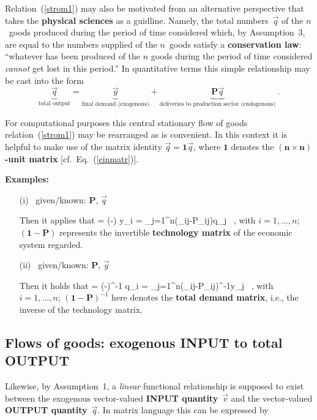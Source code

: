 \medskip
\noindent
Relation~(\ref{strom1}) may also be motivated from an alternative 
perspective that takes the {\bf physical sciences} as a guidline. 
Namely, the total numbers~$\vec{q}$ of the $n$~goods produced 
during the period of time considered which, by Assumption~3, are 
equal to the numbers supplied of the $n$~goods satisfy a {\bf  
conservation law}: ``whatever has been produced of the $n$ goods 
during the period of time considered \emph{cannot} get lost in 
this period.'' In quantitative terms this simple relationship may 
be cast into the form
%
\[
\underbrace{\vec{q}}_{\text{total output}}
=\underbrace{\vec{y}}_{\text{final demand (exogenous)}}
+\underbrace{\mathbf{P}\vec{q}}_{\text{deliveries to production sector (endogenous)}} \ .
\]
%

\medskip
\noindent
For computational purposes this central stationary flow of goods 
relation~(\ref{strom1}) may be rearranged as is convenient. In 
this context it is helpful to make use of the matrix identity  
$\vec{q}=\mathbf{1}\vec{q}$, where $\mathbf{1}$ denotes the
{\bf $\boldsymbol{(n \times n)}$-unit matrix} [cf.\ 
Eq.~(\ref{einmatr})].

\medskip
\noindent
{\bf Examples:}
%
\begin{itemize}
\item[(i)]~given/known: $\mathbf{P}$, $\vec{q}$

\medskip
\noindent
Then it applies that
%
\be
{}
 = (-)
\quad \Leftrightarrow \quad
y_{i} = \sum_{j=1}^{n}(\delta_{ij}-P_{ij})q_{j} \ ,
\ee
%
with $i = 1, \ldots, n$; $(\mathbf{1}-\mathbf{P})$ represents the 
invertible  {\bf technology matrix} of the economic system 
regarded.

\item[(ii)]~given/known: $\mathbf{P}$, $\vec{y}$

\medskip
\noindent
Then it holds that
%
\be
{}
 = (-)^{-1}
\quad \Leftrightarrow \quad
q_{i} = \sum_{j=1}^{n}(\delta_{ij}-P_{ij})^{-1}y_{j} \ ,
\ee
%
with $i = 1, \ldots, n$; $(\mathbf{1}-\mathbf{P})^{-1}$ here 
denotes the {\bf total demand matrix}, i.e., the inverse of the 
technology matrix.
\end{itemize}
%

\subsection{Flows of goods: exogenous INPUT to total OUTPUT}
Likewise, by Assumption~1, a \emph{linear} functional relationship 
is supposed to exist between the exogenous vector-valued {\bf 
INPUT quantity}~$\vec{v}$ and the vector-valued {\bf OUTPUT 
quantity}~$\vec{q}$. In matrix language this can be expressed by

